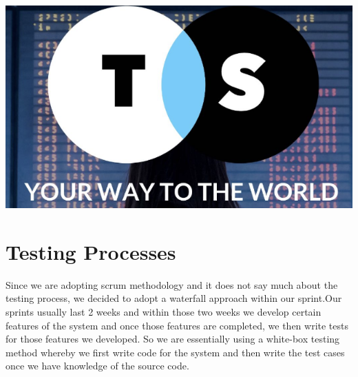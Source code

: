 \documentclass[12pt]{article}
\begin{document}
\begin{titlepage}
	
	
	
	\includegraphics{ticketSaladLogo.png}\\[1cm] %
	 
	
	\vfill %
	
	\end{titlepage}
	
	\section{Testing Processes}
	Since we are adopting scrum methodology and it does not say much about the testing process, we decided to adopt a waterfall approach within our sprint.Our sprints usually last 2 weeks and within those two weeks we develop certain features of the system and once those features are completed, we then write tests for those features we developed. So we are essentially using a white-box testing method whereby we first write code for the system and then write the test cases once we have knowledge of the source code.
	
\end{document}
